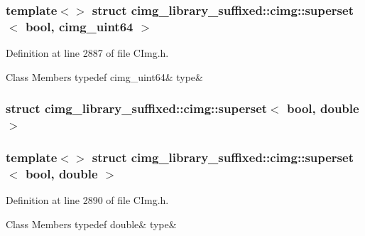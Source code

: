\subsubsection*{template$<$$>$\newline
struct cimg\+\_\+library\+\_\+suffixed\+::cimg\+::superset$<$ bool, cimg\+\_\+uint64 $>$}



Definition at line 2887 of file C\+Img.\+h.

\begin{DoxyFields}{Class Members}
\mbox{\label{namespacecimg__library__suffixed_1_1cimg_a2ab2d4c2236902e400451e305ffd9e21}} 
typedef cimg\_uint64&
type&
\\
\hline

\end{DoxyFields}
\label{structcimg__library__suffixed_1_1cimg_1_1superset_3_01bool_00_01double_01_4}
\subsubsection{struct cimg\+\_\+library\+\_\+suffixed\+:\+:cimg\+:\+:superset$<$ bool, double $>$}
\subsubsection*{template$<$$>$\newline
struct cimg\+\_\+library\+\_\+suffixed\+::cimg\+::superset$<$ bool, double $>$}



Definition at line 2890 of file C\+Img.\+h.

\begin{DoxyFields}{Class Members}
\mbox{\label{namespacecimg__library__suffixed_1_1cimg_a421bed2237f8065dfc21034a205eb345}} 
typedef double&
type&
\\
\hline

\end{DoxyFields}
\label{structcimg__library__suffixed_1_1cimg_1_1superset_3_01bool_00_01float_01_4}
